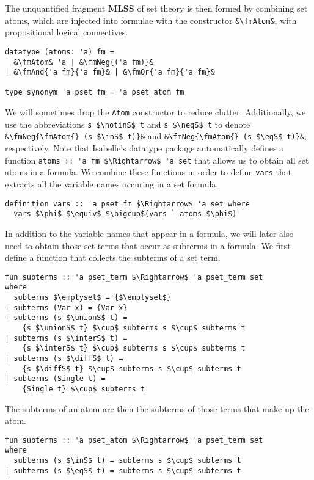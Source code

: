 \documentclass[sigplan,10pt,anonymous,review]{acmart}
\newcommand{\MLSS}{\textbf{MLSS}}
\newcommand{\unionS}{\sqcup_\text{s}}
\newcommand{\interS}{\sqcap_\text{s}}
\newcommand{\diffS}{-_\text{s}}
\newcommand{\inS}{\in_\text{s}}
\newcommand{\notinS}{\notin_\text{s}}
\newcommand{\eqS}{=_\text{s}}
\newcommand{\neqS}{\neq_\text{s}}
\newcommand{\fmAnd}[2]{#1 $\boldsymbol{\land}$ #2}
\newcommand{\fmOr}[2]{#1 $\boldsymbol{\lor}$ #2}
\newcommand{\fmNeg}[1]{$\boldsymbol{\neg}$ #1}
\newcommand{\fmAtom}{\textbf{A}}
\begin{document}
The unquantified fragment \MLSS{} of set theory is then formed by combining set atoms, which are injected into formulae with the constructor \lstinline!&\fmAtom&!, with propositional logical connectives.
\begin{lstlisting}
datatype (atoms: 'a) fm =
  &\fmAtom& 'a | &\fmNeg{('a fm)}&
| &\fmAnd{'a fm}{'a fm}& | &\fmOr{'a fm}{'a fm}&

type_synonym 'a pset_fm = 'a pset_atom fm
\end{lstlisting}
We will sometimes drop the \lstinline!Atom! constructor to reduce clutter.
Additionally, we use the abbreviations \lstinline!s $\notinS$ t! and \lstinline!s $\neqS$ t! to denote \lstinline!&\fmNeg{\fmAtom{} (s $\inS$ t)}&! and \lstinline!&\fmNeg{\fmAtom{} (s $\eqS$ t)}&!, respectively.
Note that Isabelle's datatype package automatically defines a function \lstinline!atoms :: 'a fm $\Rightarrow$ 'a set! that allows us to obtain all set atoms in a formula.
We combine these functions in order to define \lstinline!vars! that extracts all the variable names occuring in a set formula.
\begin{lstlisting}
definition vars :: 'a pset_fm $\Rightarrow$ 'a set where
  vars $\phi$ $\equiv$ $\bigcup$(vars ` atoms $\phi$)
\end{lstlisting}
In addition to the variable names that appear in a formula, we will later also need to obtain those set terms that occur as subterms in a formula. 
We first define a function that collects the subterms of a set term.
\begin{lstlisting}
fun subterms :: 'a pset_term $\Rightarrow$ 'a pset_term set
where
  subterms $\emptyset$ = {$\emptyset$}
| subterms (Var x) = {Var x}
| subterms (s $\unionS$ t) =
    {s $\unionS$ t} $\cup$ subterms s $\cup$ subterms t
| subterms (s $\interS$ t) =
    {s $\interS$ t} $\cup$ subterms s $\cup$ subterms t
| subterms (s $\diffS$ t) =
    {s $\diffS$ t} $\cup$ subterms s $\cup$ subterms t
| subterms (Single t) =
    {Single t} $\cup$ subterms t
\end{lstlisting}
The subterms of an atom are then the subterms of those terms that make up the atom.
\begin{lstlisting}
fun subterms :: 'a pset_atom $\Rightarrow$ 'a pset_term set
where
  subterms (s $\inS$ t) = subterms s $\cup$ subterms t
| subterms (s $\eqS$ t) = subterms s $\cup$ subterms t
\end{lstlisting}
\end{document}
